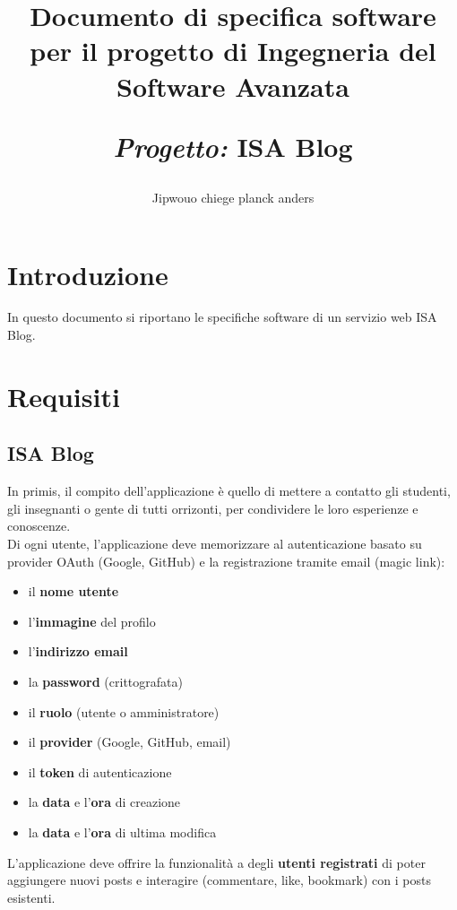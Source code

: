 \documentclass{article}
\title{Documento di specifica software per il progetto di Ingegneria del Software Avanzata\par
    \textit{Progetto:} \textbf{ISA Blog}\\}
\author{Jipwouo chiege planck anders}
\date{}
\begin{document}
\maketitle
\clearpage

\tableofcontents
\clearpage

\section{Introduzione}
\label{sec:introduzione}

In questo documento si riportano le specifiche software di un servizio web ISA Blog.

\section{Requisiti}
\label{sec:requisiti}

\subsection{ISA Blog}

In primis, il compito dell'applicazione è quello di mettere a contatto gli studenti, gli insegnanti o gente di tutti
orrizonti, per condividere le loro esperienze e conoscenze.\\

Di ogni utente, l'applicazione deve memorizzare al autenticazione basato su provider OAuth (Google, GitHub)
e la registrazione tramite email (magic link):
\begin{itemize}
    \item il \textbf{nome utente}
    \item l'\textbf{immagine} del profilo
    \item l'\textbf{indirizzo email}
    \item la \textbf{password} (crittografata)
    \item il \textbf{ruolo} (utente o amministratore)
    \item il \textbf{provider} (Google, GitHub, email)
    \item il \textbf{token} di autenticazione
    \item la \textbf{data} e l'\textbf{ora} di creazione
    \item la \textbf{data} e l'\textbf{ora} di ultima modifica
\end{itemize}

L'applicazione deve offrire la funzionalità a degli \textbf{utenti registrati}
di poter aggiungere nuovi posts e interagire (commentare, like, bookmark) con i posts esistenti.
\end{document}
